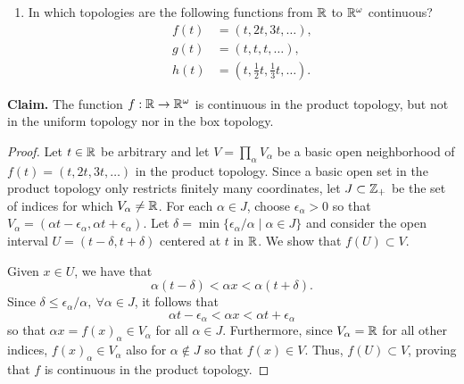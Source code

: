 \begin{solution}
    \begin{enumerate}[label={(\alph*)}, align=left, leftmargin=\parindent, listparindent=\parindent, labelwidth=0pt, itemindent=!]
        \item In which topologies are the following functions from $\mathbb{R}$ to $\mathbb{R}^\omega$ continuous?
        \begin{align*}
            f(t) &= (t, 2t, 3t, \ldots), \\
            g(t) &= (t, t, t, \ldots), \\
            h(t) &= (t, \tfrac{1}{2} t, \tfrac{1}{3} t, \ldots).
        \end{align*}
    \end{enumerate}
    \textbf{Claim.} The function $f: \mathbb{R} \rightarrow \mathbb{R}^\omega$ is continuous in the product topology, but not in the uniform topology nor in the box topology.
    \begin{proof}
        Let $t \in \mathbb{R}$ be arbitrary and let $V = \prod_\alpha V_\alpha$ be a basic open neighborhood of $f(t) = (t, 2t, 3t, \ldots)$ in the product topology.
        Since a basic open set in the product topology only restricts finitely many coordinates, let $J \subset \mathbb{Z}_+$ be the set of indices for which $V_\alpha \neq \mathbb{R}$.
        For each $\alpha \in J$, choose $\epsilon_\alpha > 0$ so that $V_\alpha = (\alpha t - \epsilon_\alpha, \alpha t + \epsilon_\alpha)$.
        Let $\delta = \min\{\epsilon_\alpha / \alpha \mid \alpha \in J\}$ and consider the open interval $U = (t - \delta, t+ \delta)$ centered at $t$ in $\mathbb{R}$.
        We show that $f(U) \subset V$.

        Given $x \in U$, we have that
        \begin{equation*}
            \alpha (t - \delta) < \alpha x < \alpha (t + \delta).
        \end{equation*}
        Since $\delta \leq \epsilon_{\alpha} / \alpha,~ \forall \alpha \in J$, it follows that
        \begin{equation*}
            \alpha t - \epsilon_\alpha < \alpha x < \alpha t + \epsilon_\alpha
        \end{equation*}
        so that $\alpha x = f(x)_\alpha \in V_\alpha$ for all $\alpha \in J$.
        Furthermore, since $V_\alpha = \mathbb{R}$ for all other indices, $f(x)_\alpha \in V_\alpha$ also for $\alpha \notin J$ so that $f(x) \in V$.
        Thus, $f(U) \subset V$, proving that $f$ is continuous in the product topology.


\end{proof}
\end{solution}
